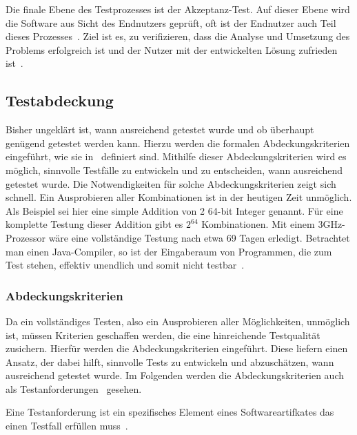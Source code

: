 Die finale Ebene des Testprozesses ist der Akzeptanz-Test.
Auf dieser Ebene wird die Software aus Sicht des Endnutzers geprüft, oft ist der Endnutzer auch Teil dieses Prozesses~\cite[vgl. S.6]{software-testing}.
Ziel ist es, zu verifizieren, dass die Analyse und Umsetzung des Problems erfolgreich ist und der Nutzer mit der entwickelten Lösung
zufrieden ist~\cite[vgl. S.6]{software-testing}.

\subsection{Testabdeckung}
\label{abdeck}

Bisher ungeklärt ist, wann ausreichend getestet wurde und ob überhaupt genügend getestet werden kann.
Hierzu werden die formalen Abdeckungskriterien eingeführt, wie sie in~\cite{software-testing} definiert sind.
Mithilfe dieser Abdeckungskriterien wird es möglich, sinnvolle Testfälle zu entwickeln und zu entscheiden, wann ausreichend getestet wurde.
Die Notwendigkeiten für solche Abdeckungskriterien zeigt sich schnell.
Ein Ausprobieren aller Kombinationen ist in der heutigen Zeit unmöglich.
Als Beispiel sei hier eine simple Addition von 2 64-bit Integer genannt.
Für eine komplette Testung dieser Addition gibt es $2^{64}$ Kombinationen.
Mit einem 3GHz-Prozessor wäre eine vollständige Testung nach etwa 69 Tagen erledigt.
Betrachtet man einen Java-Compiler, so ist der Eingaberaum von Programmen, die zum Test stehen, effektiv unendlich und somit nicht testbar~\cite[vgl. 1.3 Coverage Criteria for Testing]{software-testing}.

\subsubsection{Abdeckungskriterien}

Da ein vollständiges Testen, also ein Ausprobieren aller Möglichkeiten, unmöglich ist, müssen Kriterien geschaffen werden, die eine hinreichende Testqualität zusichern.
Hierfür werden die Abdeckungskriterien eingeführt.
Diese liefern einen Ansatz, der dabei hilft, sinnvolle Tests zu entwickeln und abzuschätzen, wann ausreichend getestet wurde.
Im Folgenden werden die Abdeckungskriterien auch als Testanforderungen~\cite[vgl. 1.3 Coverage Criteria for Testing]{software-testing} gesehen.

\begin{definition}
    Eine Testanforderung ist ein spezifisches Element eines Softwareartifkates das einen Testfall erfüllen muss~\cite[Def. 1.20]{software-testing}.
    \label{tr}
\end{definition}

